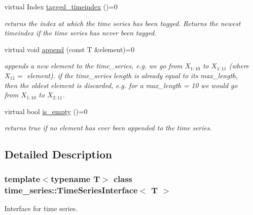 \begin{DoxyCompactItemize}
virtual Index \hyperlink{classtime__series_1_1TimeSeriesInterface_aa71ab509ac29c5da681aee9dbf65f2d8}{tagged\+\_\+timeindex} ()=0
\begin{DoxyCompactList}\small\item\em returns the index at which the time series has been tagged. Returns the newest timeindex if the time series has never been tagged. \end{DoxyCompactList}\item 
\mbox{\label{classtime__series_1_1TimeSeriesInterface_a0782c522287cf041fc253529b61041f9}} 
virtual void \hyperlink{classtime__series_1_1TimeSeriesInterface_a0782c522287cf041fc253529b61041f9}{append} (const T \&element)=0
\begin{DoxyCompactList}\small\item\em appends a new element to the time\+\_\+series, e.\+g. we go from $ X_{1:10} $ to $ X_{1:11} $ (where $ X_{11}=$ element). if the time\+\_\+series length is already equal to its max\+\_\+length, then the oldest element is discarded, e.\+g. for a max\+\_\+length = 10 we would go from $ X_{1:10} $ to $ X_{2:11} $. \end{DoxyCompactList}\item 
\mbox{\label{classtime__series_1_1TimeSeriesInterface_a932e891f3f41781af4282ada18f05d31}} 
virtual bool \hyperlink{classtime__series_1_1TimeSeriesInterface_a932e891f3f41781af4282ada18f05d31}{is\+\_\+empty} ()=0
\begin{DoxyCompactList}\small\item\em returns true if no element has ever been appended to the time series. \end{DoxyCompactList}\end{DoxyCompactItemize}


\subsection{Detailed Description}
\subsubsection*{template$<$typename T$>$\newline
class time\+\_\+series\+::\+Time\+Series\+Interface$<$ T $>$}

Interface for time series. 

